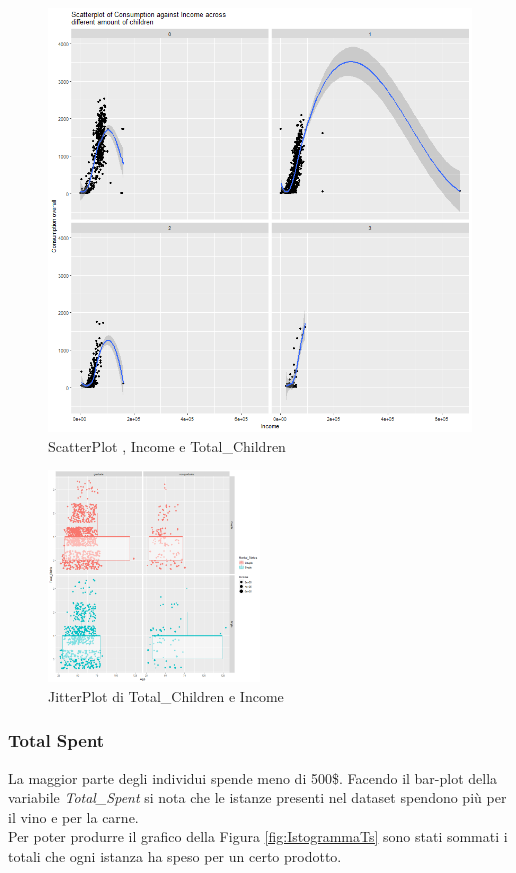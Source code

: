 \documentclass[letterpaper,11pt]{article}
\begin{document}
\begin{figure}[h!]
\begin{minipage}[c]{0.4\linewidth}
\includegraphics[width=\linewidth]{Img/EDA/EDA022.png}
\caption{ScatterPlot , Income e Total\_Children}
\label{fig:ScatterPlotTcIncome}
\end{minipage}%
\end{figure}


\begin{figure}[h!]
    \centering
    \includegraphics[width=0.5\textwidth]{Img/EDA/EDA021.png}
    \caption{JitterPlot di Total\_Children e Income}
    \label{fig:JitterPlotTcIncome}
\end{figure}

\newpage
\subsubsection{Total Spent}
La maggior parte degli individui spende meno di 500\$.
Facendo il bar-plot della variabile \textit{Total\_Spent} si nota che le istanze presenti nel dataset spendono più per il vino e per la carne.\\
Per poter produrre il grafico della Figura \ref{fig:IstogrammaTs} sono stati sommati i totali che ogni istanza ha speso per un certo prodotto.
\end{document}
